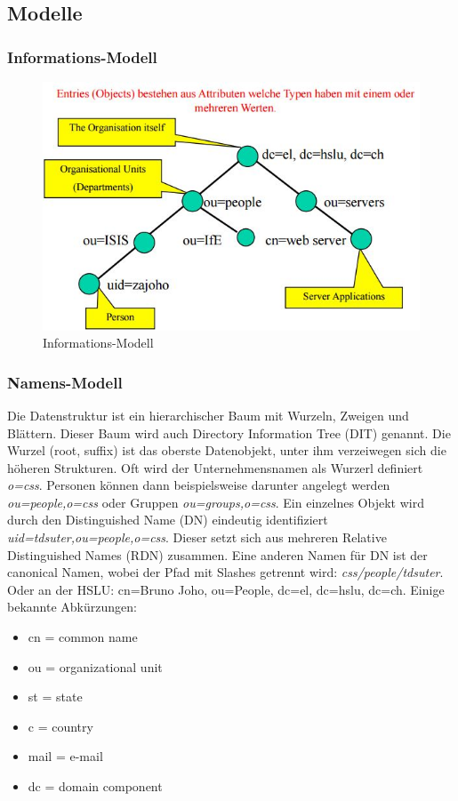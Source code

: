 \subsection{Modelle}

\subsubsection{Informations-Modell}
\begin{figure}[h!]
\centering
\includegraphics[width=0.6\linewidth]{fig/ldap-informations-modell}
\caption{Informations-Modell}
\label{fig:ldap-informations-modell}
\end{figure}

\subsubsection{Namens-Modell}
Die Datenstruktur ist ein hierarchischer Baum mit Wurzeln, Zweigen und Blättern. Dieser Baum wird auch Directory Information Tree (DIT) genannt. Die Wurzel (root, suffix) ist das oberste Datenobjekt, unter ihm verzeiwegen sich die höheren Strukturen. Oft wird der Unternehmensnamen als Wurzerl definiert \emph{o=css}. Personen können dann beispielsweise darunter angelegt werden \emph{ou=people,o=css} oder Gruppen \emph{ou=groups,o=css}. Ein einzelnes Objekt wird durch den Distinguished Name (DN) eindeutig identifiziert \emph{uid=tdsuter,ou=people,o=css}. Dieser setzt sich aus mehreren Relative Distinguished Names (RDN) zusammen. Eine anderen Namen für DN ist der canonical Namen, wobei der Pfad mit Slashes getrennt wird: \emph{css/people/tdsuter}. Oder an der HSLU: cn=Bruno Joho, ou=People, dc=el, dc=hslu, dc=ch. Einige bekannte Abkürzungen:

\begin{itemize}
	\item cn = common name
	\item ou = organizational unit
	\item st = state
	\item c = country
	\item mail = e-mail
	\item dc = domain component
\end{itemize}

